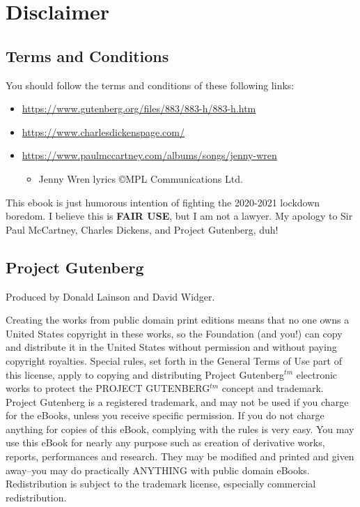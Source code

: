 \thispagestyle{plain}

\chapter*{Disclaimer}

\section*{Terms and Conditions}

You should follow the terms and conditions of these following links:
\begin{itemize}
\item \url{https://www.gutenberg.org/files/883/883-h/883-h.htm}
\item \url{https://www.charlesdickenspage.com/}
\item \url{https://www.paulmccartney.com/albums/songs/jenny-wren}
\begin{itemize}
\item Jenny Wren lyrics \copyright MPL Communications Ltd.
\end{itemize}
\end{itemize}

\noindent
This ebook is just humorous intention of fighting the 2020-2021 lockdown boredom.
I believe this is \textbf{FAIR USE}, but I am not a lawyer.
My apology to Sir Paul McCartney, Charles Dickens, and Project Gutenberg, duh!

\section*{Project Gutenberg}

Produced by Donald Lainson and David Widger.

Creating the works from public domain print editions means that no
one owns a United States copyright in these works, so the Foundation
(and you!) can copy and distribute it in the United States without
permission and without paying copyright royalties.  Special rules,
set forth in the General Terms of Use part of this license, apply to
copying and distributing Project Gutenberg$^{tm}$ electronic works to
protect the PROJECT GUTENBERG$^{tm}$ concept and trademark.  Project
Gutenberg is a registered trademark, and may not be used if you
charge for the eBooks, unless you receive specific permission.  If you
do not charge anything for copies of this eBook, complying with the
rules is very easy.  You may use this eBook for nearly any purpose
such as creation of derivative works, reports, performances and
research.  They may be modified and printed and given away--you may do
practically ANYTHING with public domain eBooks.  Redistribution is
subject to the trademark license, especially commercial redistribution.


